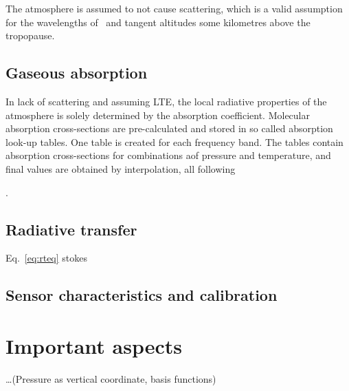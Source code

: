 The atmosphere is assumed to not cause scattering, which is a valid assumption
for the wavelengths of \smr\ and tangent altitudes some kilometres above the
tropopause. 


\subsection{Gaseous absorption}
%
In lack of scattering and assuming LTE, the local radiative properties of the
atmosphere is solely determined by the absorption coefficient. Molecular
absorption cross-sections are pre-calculated and stored in so called absorption
look-up tables. One table is created for each frequency band. The tables
contain absorption cross-sections for combinations aof pressure and
temperature, and final values are obtained by interpolation, all following

\citet{buehler:absor:11}.


\subsection{Radiative transfer}

Eq.~\ref{eq:rteq}  stokes

\subsection{Sensor characteristics and calibration}
%






\section{Important aspects}
\label{sec:arts:aspects}
%
\dots (Pressure as vertical coordinate, basis functions)





